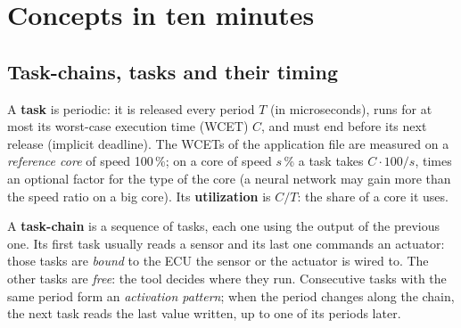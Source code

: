 \section{Concepts in ten minutes}
\label{sec:concepts}

\subsection{Task-chains, tasks and their timing}

A \textbf{task} is periodic: it is released every period $T$ (in
microseconds), runs for at most its worst-case execution time (WCET) $C$,
and must end before its next release (implicit deadline). The WCETs of the
application file are measured on a \emph{reference core} of speed
100\,\%; on a core of speed $s$\,\% a task takes $C \cdot 100/s$, times an
optional factor for the type of the core (a neural network may gain more
than the speed ratio on a big core). Its \textbf{utilization} is
$C/T$: the share of a core it uses.

A \textbf{task-chain} is a sequence of tasks, each one using the output of
the previous one. Its first task usually reads a sensor and its last one
commands an actuator: those tasks are \emph{bound} to the ECU the sensor or
the actuator is wired to. The other tasks are \emph{free}: the tool decides
where they run. Consecutive tasks with the same period form an
\emph{activation pattern}; when the period changes along the chain, the
next task reads the last value written, up to one of its periods later.

